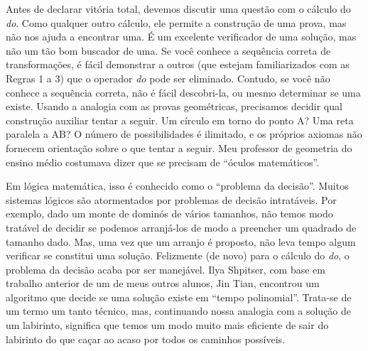 \documentclass[11pt,a5paper,twoside]{book}
\begin{document}
Antes de declarar vitória total, devemos discutir uma questão com o cálculo do \textit{do}. Como qualquer outro cálculo, ele permite a construção de uma prova, mas não nos ajuda a encontrar uma. É um excelente verificador de uma solução, mas não um tão bom buscador de uma. Se você conhece a sequência correta de transformações, é fácil demonstrar a outros (que estejam familiarizados com as Regras 1 a 3) que o operador \textit{do} pode ser eliminado. Contudo, se você não conhece a sequência correta, não é fácil descobri-la, ou mesmo determinar se uma existe. Usando a analogia com as provas geométricas, precisamos decidir qual construção auxiliar tentar a seguir. Um círculo em torno do ponto A? Uma reta paralela a AB? O número de possibilidades é ilimitado, e os próprios axiomas não fornecem orientação sobre o que tentar a seguir. Meu professor de geometria do ensino médio costumava dizer que se precisam de “óculos matemáticos”.

Em lógica matemática, isso é conhecido como o “problema da decisão”. Muitos sistemas lógicos são atormentados por problemas de decisão intratáveis. Por exemplo, dado um monte de dominós de vários tamanhos, não temos modo tratável de decidir se podemos arranjá-los de modo a preencher um quadrado de tamanho dado. Mas, uma vez que um arranjo é proposto, não leva tempo algum verificar se constitui uma solução. Felizmente (de novo) para o cálculo do \textit{do}, o problema da decisão acaba por ser manejável. Ilya Shpitser, com base em trabalho anterior de um de meus outros alunos, Jin Tian, encontrou um algoritmo que decide se uma solução existe em “tempo polinomial”. Trata-se de um termo um tanto técnico, mas, continuando nossa analogia com a solução de um labirinto, significa que temos um modo muito mais eficiente de sair do labirinto do que caçar ao acaso por todos os caminhos possíveis.
\end{document}

